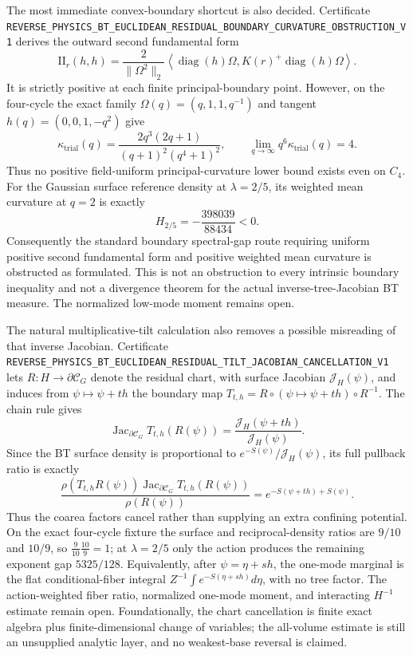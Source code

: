 \documentclass[11pt]{article}
\theoremstyle{definition}
\theoremstyle{remark}
\newcommand{\cert}[1]{\nolinkurl{#1}}
\begin{document}
The most immediate convex-boundary shortcut is also decided.  Certificate
\cert{REVERSE_PHYSICS_BT_EUCLIDEAN_RESIDUAL_BOUNDARY_CURVATURE_OBSTRUCTION_V1}
derives the outward second fundamental form
\[
 \mathrm{II}_r(h,h)=\frac{2}{\|\Omega^2\|_2}
 \left\langle\operatorname{diag}(h)\Omega,
 K(r)^+\operatorname{diag}(h)\Omega\right\rangle .
\]
It is strictly positive at each finite principal-boundary point.  However,
on the four-cycle the exact family
\(\Omega(q)=(q,1,1,q^{-1})\) and tangent
\(h(q)=(0,0,1,-q^2)\) give
\[
 \kappa_{\mathrm{trial}}(q)
 =\frac{2q^3(2q+1)}{(q+1)^2(q^4+1)^2},
 \qquad
 \lim_{q\to\infty}q^6\kappa_{\mathrm{trial}}(q)=4.
\]
Thus no positive field-uniform principal-curvature lower bound exists even
on \(C_4\).  For the Gaussian surface reference density at
\(\lambda=2/5\), its weighted mean curvature at \(q=2\) is exactly
\[
                         H_{2/5}=-\frac{398039}{88434}<0.
\]
Consequently the standard boundary spectral-gap route requiring uniform
positive second fundamental form and positive weighted mean curvature is
obstructed as formulated.  This is not an obstruction to every intrinsic
boundary inequality and not a divergence theorem for the actual
inverse-tree-Jacobian BT measure.  The normalized low-mode moment remains
open.

The natural multiplicative-tilt calculation also removes a possible
misreading of that inverse Jacobian.  Certificate
\cert{REVERSE_PHYSICS_BT_EUCLIDEAN_RESIDUAL_TILT_JACOBIAN_CANCELLATION_V1}
lets \(R:H\to\partial\mathcal C_G\) denote the residual chart, with surface
Jacobian \(\mathcal J_H(\psi)\), and induces from
\(\psi\mapsto\psi+th\) the boundary map
\(T_{t,h}=R\circ(\psi\mapsto\psi+th)\circ R^{-1}\).  The chain rule gives
\[
 \operatorname{Jac}_{\partial\mathcal C_G}T_{t,h}(R(\psi))
 =\frac{\mathcal J_H(\psi+th)}{\mathcal J_H(\psi)}.
\]
Since the BT surface density is proportional to
\(e^{-S(\psi)}/\mathcal J_H(\psi)\), its full pullback ratio is exactly
\[
 \frac{\rho(T_{t,h}R(\psi))
       \operatorname{Jac}_{\partial\mathcal C_G}T_{t,h}(R(\psi))}
      {\rho(R(\psi))}
 =e^{-S(\psi+th)+S(\psi)}.
\]
Thus the coarea factors cancel rather than supplying an extra confining
potential.  On the exact four-cycle fixture the surface and reciprocal-density
ratios are \(9/10\) and \(10/9\), so
\(\frac9{10}\frac{10}9=1\); at \(\lambda=2/5\) only the action produces the
remaining exponent gap \(5325/128\).  Equivalently, after
\(\psi=\eta+sh\), the one-mode marginal is the flat conditional-fiber integral
\(Z^{-1}\int e^{-S(\eta+sh)}d\eta\), with no tree factor.  The action-weighted
fiber ratio, normalized one-mode moment, and interacting \(H^{-1}\) estimate
remain open.  Foundationally, the chart cancellation is finite exact algebra
plus finite-dimensional change of variables; the all-volume estimate is still
an unsupplied analytic layer, and no weakest-base reversal is claimed.
\end{document}
